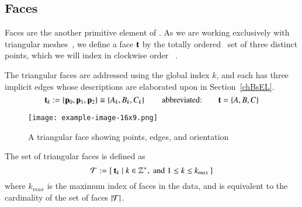 \subsection{Faces}
\label{ch2s3ssF}
Faces are the another primitive element of \tdd{}. As we are working exclusively with triangular meshes~\cite[p.~26]{Mara12}, we define a face $\mathbf{t}$ by the totally ordered~\cite{Weisstein19a} set of three distinct points, which we will index in clockwise order
~\cite[p.~4]{Mara17}.

The triangular faces are addressed using the global index $k$, and each has three implicit edges whose descriptions are elaborated upon in Section~\ref{chBsEL}.
\begin{equation}
	\mathbf{t}_k := \left \{\mathbf{p}_0, \mathbf{p}_1, \mathbf{p}_2\right \} \equiv \left \{A_k, B_k, C_k\right \} \hspace{20pt}\text{abbreviated:}\hspace{20pt} \mathbf{t} = \left \{A, B, C\right \}
	\label{eq:defineSetOfFaces}
\end{equation}%
%
%
\begin{figure}[ht]
\ffigbox
	{\texttt{[image: example-image-16x9.png]}}
	{\caption[A Triangular Face]{A triangular face showing points, edges, and orientation}\label{fig:facesOfAMesh}}
\end{figure}
%
The set of triangular faces is defined as
\begin{equation}
	\mathcal{T} := \left \{\:\mathbf{t}_k \mid k \in \mathbb{Z}^+, \;\text{and}\; 1\leq k \leq k_{max}\:\right \}
	\label{eq:defineSetOfFaces}
\end{equation}
where $k_{max}$ is the maximum index of faces in the data, and is equivalent to the cardinality of the set of faces $|\mathcal{T}|$.%
%
%

